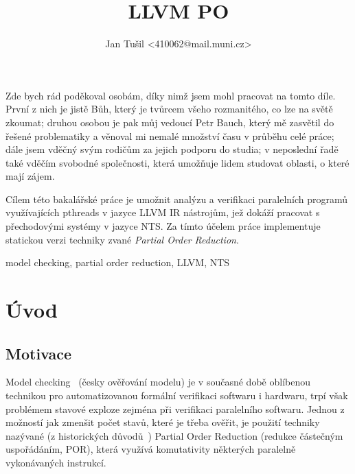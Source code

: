 \documentclass[12pt]{fithesis2}
\author{Jan Tušil <410062@mail.muni.cz>}
\title{LLVM PO}
\begin{document}
\FrontMatter
\ThesisTitlePage





\begin{ThesisDeclaration}
\DeclarationText
\AdvisorName
\end{ThesisDeclaration}

\begin{ThesisThanks}
Zde bych rád poděkoval osobám, díky nimž jsem mohl pracovat na tomto díle. První z nich je jistě Bůh, který je tvůrcem všeho rozmanitého, co lze na světě zkoumat; druhou osobou je pak můj vedoucí Petr Bauch, který mě zasvětil do řešené problematiky a věnoval mi nemalé množství času v průběhu celé práce; dále jsem vděčný svým rodičům za jejich podporu do studia; v neposlední řadě také vděčím svobodné společnosti, která umožňuje lidem studovat oblasti, o které mají zájem.
\end{ThesisThanks}

\begin{ThesisAbstract}
Cílem této bakalářské práce je umožnit analýzu a verifikaci paralelních programů využívajících pthreads v jazyce LLVM IR nástrojům, jež dokáží pracovat s přechodovými systémy v jazyce NTS. Za tímto účelem práce implementuje statickou verzi techniky zvané \textit{Partial Order Reduction}.
\end{ThesisAbstract}
\begin{ThesisKeyWords}
model checking, partial order reduction, LLVM, NTS
\end{ThesisKeyWords}
\MainMatter

\tableofcontents

\chapter{Úvod}
\section{Motivace}
Model checking~\cite{CLARKE} (česky ověřování modelu) je v současné době oblíbenou technikou pro automatizovanou formální verifikaci softwaru i hardwaru, trpí však problémem stavové exploze zejména při verifikaci paralelního softwaru. Jednou z možností jak zmenšit počet stavů, které je třeba ověřit, je použití techniky nazývané (z historických důvodů~\cite{CLARKE}) Partial Order Reduction (redukce částečným uspořádáním, POR), která využívá komutativity některých paralelně vykonávaných instrukcí.
\end{document}
